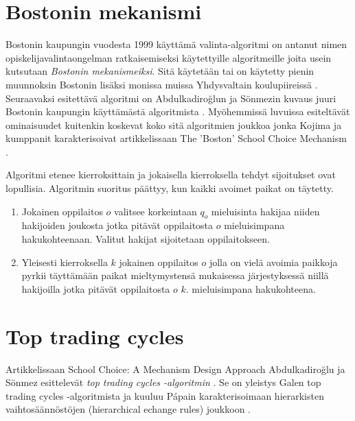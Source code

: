 \documentclass[gradu, twoside]{tktltiki}
\begin{document}
\section{Bostonin mekanismi}

Bostonin kaupungin vuodesta 1999 käyttämä valinta-algoritmi on antanut
nimen opiskelijavalintaongelman ratkaisemiseksi käytettyille
algoritmeille joita usein kutsutaan \emph{Bostonin mekanismeiksi}.
Sitä käytetään tai on käytetty pienin muunnoksin Bostonin lisäksi
monissa muissa Yhdysvaltain koulupiireissä \cite{abdusön03}.
Seuraavaksi esitettävä algoritmi on Abdulkadiroğlun ja Sönmezin kuvaus
juuri Bostonin kaupungin käyttämästä algoritmista \cite{abdusön03}.
Myöhemmissä luvuissa esiteltävät ominaisuudet kuitenkin koskevat koko
sitä algoritmien joukkoa jonka Kojima ja kumppanit karakterisoivat
artikkelissaan The 'Boston' School Choice Mechanism \cite{kojima10}.

Algoritmi etenee kierroksittain ja jokaisella kierroksella tehdyt
sijoitukset ovat lopullisia. Algoritmin suoritus päättyy, kun kaikki
avoimet paikat on täytetty.

\begin{enumerate}
\item Jokainen oppilaitos $o$ valitsee korkeintaan $q_o$ mieluisinta
  hakijaa niiden hakijoiden joukosta jotka pitävät oppilaitosta $o$
  mieluisimpana hakukohteenaan. Valitut hakijat sijoitetaan
  oppilaitokseen.

\setcounter{enumi}{10}
\renewcommand{\labelenumi}{\alph{enumi}.}
\item Yleisesti kierroksella $k$ jokainen oppilaitos $o$ jolla on
  vielä avoimia paikkoja pyrkii täyttämään paikat mieltymystensä
  mukaisessa järjestyksessä niillä hakijoilla jotka pitävät
  oppilaitosta $o$ $k.$ mieluisimpana hakukohteena.
\end{enumerate}

\section{Top trading cycles}

Artikkelissaan School Choice: A Mechanism Design Approach
Abdulkadiroğlu ja Sönmez esittelevät \emph{top trading cycles
  -algoritmin} \cite{abdusön03}. Se on yleistys Galen top trading
cycles -algoritmista \cite{shapley74} ja kuuluu Pápain
karakterisoimaan hierarkisten vaihtosäännöstöjen (hierarchical echange
rules) joukkoon \cite{papai00}.
\end{document}

